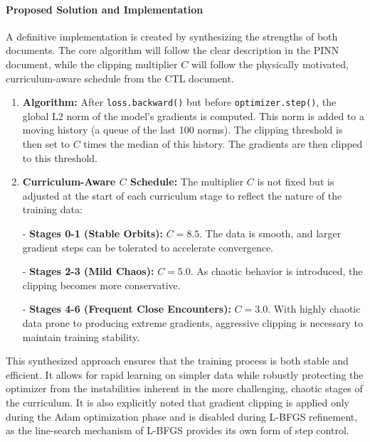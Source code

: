 \paragraph{Proposed Solution and Implementation}
A definitive implementation is created by synthesizing the strengths of both documents. The core algorithm will follow the clear description in the PINN document, while the clipping multiplier $C$ will follow the physically motivated, curriculum-aware schedule from the CTL document.
\begin{enumerate}
    \item \textbf{Algorithm:} After \texttt{loss.backward()} but before \texttt{optimizer.step()}, the global L2 norm of the model's gradients is computed. This norm is added to a moving history (a queue of the last 100 norms). The clipping threshold is then set to $C$ times the median of this history. The gradients are then clipped to this threshold.
    \item \textbf{Curriculum-Aware $C$ Schedule:} The multiplier $C$ is not fixed but is adjusted at the start of each curriculum stage to reflect the nature of the training data:


- \textbf{Stages 0-1 (Stable Orbits):} $C = 8.5$. The data is smooth, and larger gradient steps can be tolerated to accelerate convergence.

- \textbf{Stages 2-3 (Mild Chaos):} $C = 5.0$. As chaotic behavior is introduced, the clipping becomes more conservative.

- \textbf{Stages 4-6 (Frequent Close Encounters):} $C = 3.0$. With highly chaotic data prone to producing extreme gradients, aggressive clipping is necessary to maintain training stability.

\end{enumerate}
This synthesized approach ensures that the training process is both stable and efficient. It allows for rapid learning on simpler data while robustly protecting the optimizer from the instabilities inherent in the more challenging, chaotic stages of the curriculum. It is also explicitly noted that gradient clipping is applied only during the Adam optimization phase and is disabled during L-BFGS refinement, as the line-search mechanism of L-BFGS provides its own form of step control.
